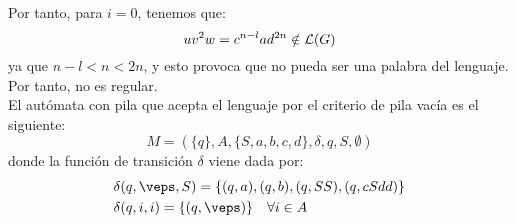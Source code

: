 \begin{ejercicio}
    Por tanto, para $i=0$, tenemos que:
    \begin{equation*}
        uv^2w = c^{n-l}ad^{2n}\notin \mathcal{L}(G)
    \end{equation*}
    ya que $n-l<n<2n$, y esto provoca que no pueda ser una palabra del lenguaje. Por tanto, no es regular.\\

    El autómata con pila que acepta el lenguaje por el criterio de pila vacía es el siguiente:
    \begin{equation*}
        M=(\{q\},A,\{S,a,b,c,d\},\delta,q,S,\emptyset)
    \end{equation*}
    donde la función de transición $\delta$ viene dada por:
    \begin{align*}
        &\delta(q,\veps,S) = \{(q,a),(q,b),(q,SS),(q,cSdd)\} \\
        &\delta(q,i,i) = \{(q,\veps)\} \quad \forall i\in A
    \end{align*}
\end{ejercicio}

